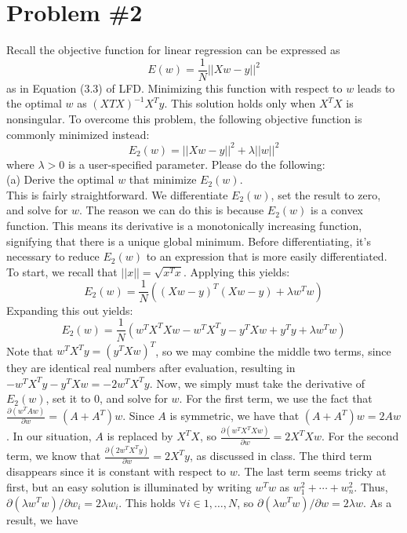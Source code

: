 \documentclass[12pt]{article}
\begin{document}
	\section*{Problem \#2}
	Recall the objective function for linear regression can be expressed as 
	\begin{equation*}
	E(w) = \frac{1}{N} ||Xw-y||^2
	\end{equation*}
	as in Equation (3.3) of LFD. Minimizing this function with respect to $w$ leads to the optimal
	$w$ as $(X T X)^{-1} X^T y$. This solution holds only when $X^TX$ is nonsingular. To overcome this problem, the following objective function is commonly minimized instead:
	\begin{equation*}
	E_2(w) = ||Xw-y||^2 + \lambda ||w||^2
	\end{equation*}
	where $\lambda > 0$ is a user-specified parameter. Please do the following: \\
	(a) Derive the optimal $w$ that minimize $E_2(w)$.\\
	This is fairly straightforward. We differentiate $E_2(w)$, set the result to zero, and solve for $w$. The reason we can do this is because $E_2(w)$ is a convex function. This means its derivative is a monotonically increasing function, signifying that there is a unique global minimum. 
	Before differentiating, it's necessary to reduce $E_2(w)$ to an expression that is more easily differentiated. To start, we recall that $||x||=\sqrt{x^T x}$. Applying this yields:
	\begin{equation*}
	E_2(w) = \frac{1}{N}((Xw-y)^T(Xw-y)+\lambda w^T w)
	\end{equation*}
	Expanding this out yields:
	\begin{equation*}
	E_2(w) = \frac{1}{N} (w^T X^T X w-w^T X^T y-y^T Xw+y^T y + \lambda w^T w)
	\end{equation*}
	Note that $w^T X^T y=(y^T Xw)^T$, so we may combine the middle two terms, since they are identical real numbers after evaluation, resulting in $-w^T X^T y -y^T Xw=-2w^T X^T y$. Now, we simply must take the derivative of $E_2(w)$, set it to $0$, and solve for $w$. For the first term, we use the fact that $\frac{\partial(w^T Aw)}{\partial w} = (A+A^T)w$. Since $A$ is symmetric, we have that $(A+A^T)w=2Aw$. In our situation, $A$ is replaced by $X^T X$, so $\frac{\partial(w^T X^T Xw)}{\partial w} = 2X^T Xw$. For the second term, we know that $\frac{\partial(2w^T X^T y)}{\partial w} = 2X^T y$, as discussed in class. The third term disappears since it is constant with respect to $w$. The last term seems tricky at first, but an easy solution is illuminated by writing $w^T w$ as $w_1^2+\cdots+w_n^2$. Thus, $\partial (\lambda w^T w) / \partial w_i = 2\lambda w_i$. This holds $\forall i \in {1,\dots, N}$, so $\partial (\lambda w^T w) / \partial w = 2\lambda w$. As a result, we have
\end{document}
